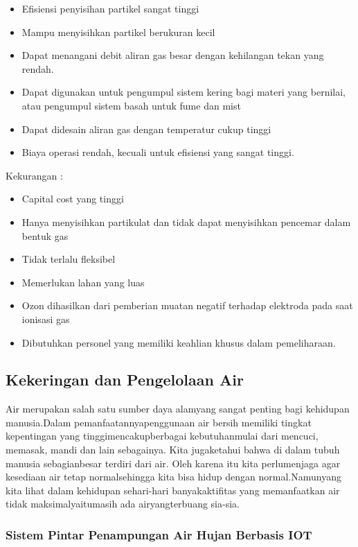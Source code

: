\documentclass[../wastek.tex]{subfiles}
\begin{document}
\begin{itemize}
	\item Efisiensi penyisihan partikel sangat tinggi
	\item Mampu menyisihkan partikel berukuran kecil
	\item Dapat menangani debit aliran gas besar dengan kehilangan tekan yang rendah.
	\item Dapat digunakan untuk pengumpul sistem kering bagi materi yang bernilai, atau pengumpul sistem basah untuk fume dan mist
	\item Dapat didesain aliran gas dengan temperatur cukup tinggi
	\item Biaya operasi rendah, kecuali untuk efisiensi yang sangat tinggi.
\end{itemize}


Kekurangan :

\begin{itemize}
	\item Capital cost yang tinggi
	\item Hanya menyisihkan partikulat dan tidak dapat menyisihkan pencemar dalam bentuk gas
	\item Tidak terlalu fleksibel
	\item Memerlukan lahan yang luas
	\item Ozon dihasilkan dari pemberian muatan negatif terhadap elektroda pada saat ionisasi gas
	\item Dibutuhkan personel yang memiliki keahlian khusus dalam pemeliharaan.
\end{itemize}

\subsection{Kekeringan dan Pengelolaan Air}%
\label{sub:Kekeringan dan Pengelolaan Air}
Air merupakan salah satu sumber daya alamyang sangat penting bagi kehidupan manusia.Dalam pemanfaatannyapenggunaan air bersih memiliki tingkat kepentingan yang tinggimencakupberbagai kebutuhanmulai  dari  mencuci,  memasak,  mandi  dan  lain  sebagainya.  Kita  jugaketahui bahwa di dalam tubuh manusia sebagianbesar  terdiri dari air. Oleh karena itu kita perlumenjaga agar  kesediaan  air  tetap  normalsehingga  kita  bisa  hidup  dengan  normal.Namunyang  kita  lihat dalam  kehidupan  sehari-hari banyakaktifitas  yang  memanfaatkan  air  tidak  maksimalyaitumasih ada airyangterbuang sia-sia.

\subsubsection{Sistem Pintar Penampungan Air Hujan Berbasis IOT}%
\label{ssub:sistem_pintar_penampungan_air_hujan_berbasis_iot}
\end{document}
